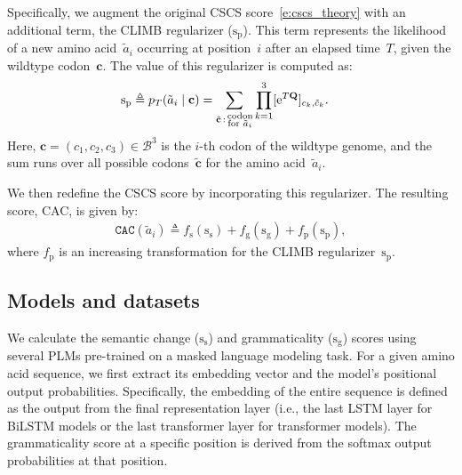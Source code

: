 \documentclass[pdflatex,sn-nature]{sn-jnl}
\begin{document}
Specifically, we augment the original CSCS score~\eqref{e:cscs_theory} with an additional term, the CLIMB regularizer ($\mathrm{s}_\text{p}$).
%
This term represents the likelihood of a new amino acid~$\tilde{a}_i$ occurring at position~$i$ after an elapsed time~$T$, given the wildtype codon~$\mathbf{c}$.
The value of this regularizer is computed as:
\begin{align}
    \mathrm{s}_\text{p}
    \triangleq p_T(\tilde{a}_i \mid \mathbf{c})
    &=
    \sum_{\tilde{\mathbf{c}} \mathop{:} \begin{subarray}{c}
        \text{codon} \\ \text{for $\tilde{a}_i$}
    \end{subarray}}
    \prod_{k=1}^{3} [\mathrm{e}^{T\mathbf{Q}}]_{c_k, \tilde{c}_k}.
    \label{e:CLIMB}
\end{align}
Here, $\mathbf{c} = (c_1, c_2, c_3) \in \mathcal{B}^3$ is the $i$-th codon of the wildtype genome, and the sum runs over all possible codons~$\tilde{\mathbf{c}}$ for the amino acid~$\tilde{a}_i$.

We then redefine the CSCS score by incorporating this regularizer.
The resulting score, CAC, is given by:
\begin{align}
    \mathtt{CAC}(\tilde{a}_i)
    \triangleq
    f_\text{s}(\mathrm{s}_\text{s}) + f_\text{g}(\mathrm{s}_\text{g})
    + f_\text{p}(\mathrm{s}_\text{p}),
    \label{e:cscs_reg}
\end{align}
where $f_\text{p}$ is an increasing transformation for the CLIMB regularizer~$\mathrm{s}_\text{p}$.

\subsection*{Models and datasets}



We calculate the semantic change ($\mathrm{s}_\text{s}$) and grammaticality ($\mathrm{s}_\text{g}$) scores using several PLMs pre-trained on a masked language modeling task.
%
For a given amino acid sequence, we first extract its embedding vector and the model's positional output probabilities.
Specifically, the embedding of the entire sequence is defined as the output from the final representation layer (i.e., the last LSTM layer for BiLSTM models or the last transformer layer for transformer models).
The grammaticality score at a specific position is derived from the softmax output probabilities at that position.
\end{document}
